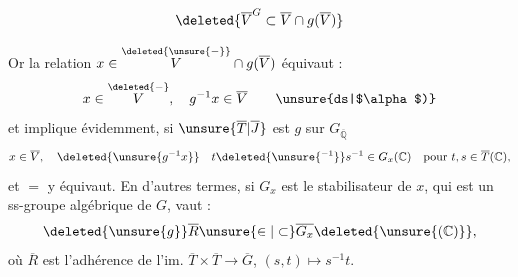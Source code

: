 \[
\deleted{\overline V^{G}\subset\overline V\cap g(\overline V)}
\]

Or la relation $x\in\overset{\deleted{\unsure{-}}}{V}\cap g(\overline V)$ équivaut :
\begingroup\makeatletter\tagsleft@true\makeatother
\[
x\in\overset{\deleted{-}}{V},\quad g^{-1}x\in\overline V \tag*{\unsure{ds|$\alpha$)}}
\]
\endgroup
et implique évidemment, si $\unsure{\overline T|\overline J}$ est    $g$ sur $G_{\overline{\mathbb Q}}$
\[
x\in\overline V,\quad\deleted{\unsure{g^{-1}x}}\quad t\deleted{\unsure{^{-1}}}s^{-1}\in G_x(\mathbb C)\quad\text{pour }t,s\in\overline T(\mathbb C),
\]
et $=$ y équivaut.
En d'autres termes, si $G_x$ est le stabilisateur de $x$, qui est un ss-groupe algébrique de $G$,  vaut :
\[
\deleted{\unsure{g}}\overline R\unsure{\in|\subset}\overline{G_x}\deleted{\unsure{(\mathbb C)}},
\]
où $\overline R$ est l'adhérence de l'im. $\overline T\times\overline T\longrightarrow\overline G$, $(s,t)\longmapsto s^{-1}t$.


